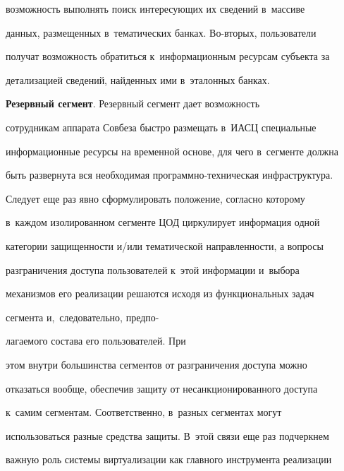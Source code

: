 возможность выполнять поиск интересующих их сведений в~массиве 


данных, размещенных в~тематических банках. Во-вторых, пользователи 


получат возможность обратиться к~информационным ресурсам субъекта за 


детализацией сведений, найденных ими в~эталонных банках.





\textbf{Резервный сегмент}. Резервный сегмент дает возможность 


сотрудникам аппарата Совбеза быстро размещать в~ИАСЦ специальные 


информационные ресурсы на временной основе, для чего в~сегменте должна 


быть развернута вся необходимая программно-техническая инфраструктура.





Следует еще раз явно сформулировать положение, согласно которому 


в~каж\-дом изолированном сегменте ЦОД циркулирует информация одной 


категории защищенности и\!/\!или тематической направленности, а вопросы 


разграничения доступа пользователей к~этой информации и~выбора 


механизмов его реализации решаются исходя из функциональных задач 


сегмента и,~следовательно, предпо-\linebreak\vspace*{-12pt}





\pagebreak





\noindent


лагаемого состава его пользователей. При 


этом внутри большинства сегментов от разграничения доступа можно 


отказаться вообще, обеспечив защиту от несанкционированного доступа 


к~самим сегментам. Соответственно, в~разных сегментах могут 


использоваться разные средства защиты. В~этой связи еще раз подчеркнем 


важную роль системы виртуализации как главного инструмента реализации 


